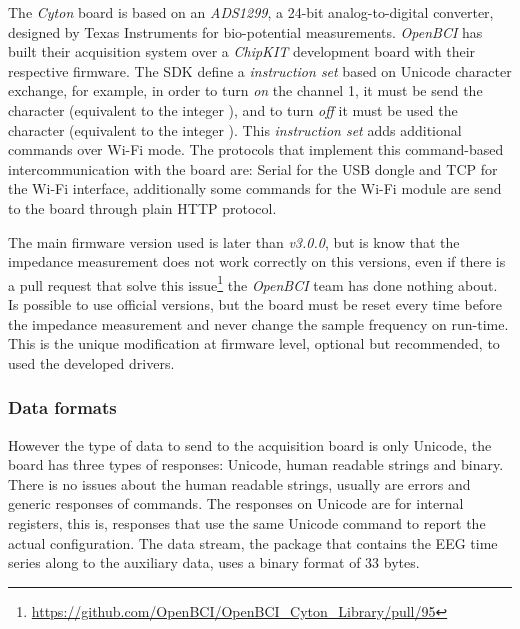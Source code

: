 The \textit{Cyton} board is based on an \textit{ADS1299}, a 24-bit analog-to-digital converter, designed by Texas Instruments for bio-potential measurements. \textit{OpenBCI} has built their acquisition system over a \textit{ChipKIT} development board with their respective firmware. The \gls*{SDK} define a \textit{instruction set} based on Unicode character exchange, for example, in order to turn \textit{on} the channel 1, it must be send the character  (equivalent to the integer ), and to turn \textit{off} it must be used the character  (equivalent to the integer ). This \textit{instruction set} adds additional commands over Wi-Fi mode. The protocols that implement this command-based intercommunication with the board are: Serial for the USB dongle and \gls*{TCP} for the Wi-Fi interface, additionally some commands for the Wi-Fi module are send to the board through plain HTTP protocol.
 
The main firmware version used is later than \textit{v3.0.0}, but is know that the impedance measurement does not work correctly on this versions, even if there is a pull request that solve this issue\footnote{\href{https://github.com/OpenBCI/OpenBCI_Cyton_Library/pull/95}{https://github.com/OpenBCI/OpenBCI_Cyton_Library/pull/95}} the \textit{OpenBCI} team has done nothing about. Is possible to use official versions, but the board must be reset every time before the impedance measurement and never change the sample frequency on run-time. This is the unique modification at firmware level, optional but recommended, to used the developed drivers.

\subsubsection{Data formats}





However the type of data to send to the acquisition board is only Unicode, the board has three types of responses: Unicode, human readable strings and binary. There is no issues about the human readable strings, usually are errors and generic responses of commands. The responses on Unicode are for internal registers, this is, responses that use the same Unicode command to report the actual configuration. The data stream, the package that contains the EEG time series along to the auxiliary data, uses a binary format of 33 bytes.

